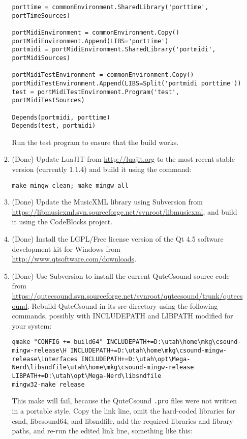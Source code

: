\documentclass[11pt,letterpaper,onecolumn]{scrartcl}
\begin{document}
\begin{sloppypar}
\begin{enumerate}
\begin{enumerate}
\begin{lstlisting}
porttime = commonEnvironment.SharedLibrary('porttime', portTimeSources)

portMidiEnvironment = commonEnvironment.Copy()
portMidiEnvironment.Append(LIBS='porttime')
portmidi = portMidiEnvironment.SharedLibrary('portmidi', portMidiSources)

portMidiTestEnvironment = commonEnvironment.Copy()
portMidiTestEnvironment.Append(LIBS=Split('portmidi porttime'))
test = portMidiTestEnvironment.Program('test', portMidiTestSources)

Depends(portmidi, porttime)
Depends(test, portmidi)
\end{lstlisting}

			Run the test program to ensure that the build works.
		  
		  \item (Done) Update LuaJIT from \url{http://luajit.org} to the most recent stable version (currently 1.1.4) and build it using the command:
		  
\begin{lstlisting}
make mingw clean; make mingw all
\end{lstlisting}

			\item (Done) Update the MusicXML library using Subversion from \url{https://libmusicxml.svn.sourceforge.net/svnroot/libmusicxml}, and build it using the CodeBlocks project.

			\item (Done) Install the LGPL/Free license version of the Qt 4.5 software development kit for Windows from \url{http://www.qtsoftware.com/downloads}.
			
			\item (Done) Use Subversion to install the current QuteCsound source code from \url{https://qutecsound.svn.sourceforge.net/svnroot/qutecsound/trunk/qutecsound}. Rebuild QuteCsound in its src directory using the following commands, possibly with INCLUDEPATH and LIBPATH modified for your system:
			
			\begin{lstlisting}
qmake "CONFIG += build64" INCLUDEPATH+=D:\utah\home\mkg\csound-mingw-release\H INCLUDEPATH+=D:\utah\home\mkg\csound-mingw-release\interfaces INCLUDEPATH+=D:\utah\opt\Mega-Nerd\libsndfile\utah\home\mkg\csound-mingw-release LIBPATH+=D:\utah\opt\Mega-Nerd\libsndfile
mingw32-make release
			\end{lstlisting}
			
			\noindent This make will fail, because the QuteCsound \texttt{.pro} files were not written in a portable style. Copy the link line, omit the hard-coded libraries for csnd, libcsound64, and libsndfile, add the required libraries and library paths, and re-run the edited link line, something like this:
			

\end{enumerate}
\end{enumerate}
\end{sloppypar}
\end{document}
